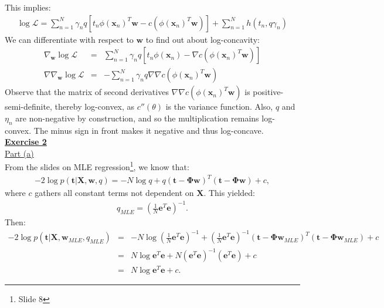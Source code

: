 \documentclass[a4paper, 11pt]{article}
\begin{document}
This implies:
\begin{eqnarray}
\log \mathcal{L} = \sum_{n=1}^{N} \gamma_n q [ t_n \phi(\mathbf{x}_n)^T \mathbf{w} - c(\phi(\mathbf{x}_n)^T \mathbf{w}) ] + \sum_{n=1}^{N} h(t_n, q \gamma_n) \nonumber
\end{eqnarray}
We can differentiate with respect to $\mathbf{w}$ to find out about log-concavity:
\begin{eqnarray}
\nabla_{\mathbf{w}} \log \mathcal{L} &=&  \sum_{n=1}^{N} \gamma_n q [ t_n \phi(\mathbf{x}_n) - \nabla c(\phi(\mathbf{x}_n)^T \mathbf{w}) ] \nonumber \\
\nabla \nabla_{\mathbf{w}} \log \mathcal{L} &=& - \sum_{n=1}^{N} \gamma_n q \nabla \nabla c(\phi(\mathbf{x}_n)^T \mathbf{w}) \nonumber
\end{eqnarray}
Observe that the matrix of second derivatives $\nabla \nabla c(\phi(\mathbf{x}_n)^T \mathbf{w})$ is positive-semi-definite, thereby log-convex, as $c''(\theta)$ is the variance function. Also, $q$ and $\eta_n$ are non-negative by construction, and so the multiplication remains log-convex. The minus sign in front makes it negative and  thus log-concave.\\
\newpage
\textbf{\underline{Exercise 2}}\\
\newline \underline{Part (a)}\\
\newline From the slides on MLE regression\footnote{Slide 8}, we know that:
\begin{eqnarray}
-2 \log p(\mathbf{t} | \mathbf{X}, \mathbf{w}, q) = -N \log q + q (\mathbf{t} - \mathbf{\Phi w})^T (\mathbf{t} - \mathbf{\Phi w}) + c, \nonumber
\end{eqnarray}
where $c$ gathers all constant terms not dependent on $\mathbf{X}$. This yielded:
\begin{eqnarray}
q_{MLE} = \left( \frac{1}{N} \mathbf{e}^T \mathbf{e} \right)^{-1}. \nonumber
\end{eqnarray}
Then:
\begin{eqnarray}
-2 \log p(\mathbf{t} | \mathbf{X}, \mathbf{w}_{MLE}, q_{MLE}) &=& -N \log \left( \frac{1}{N} \mathbf{e}^T \mathbf{e} \right)^{-1} + \left( \frac{1}{N} \mathbf{e}^T \mathbf{e} \right)^{-1} (\mathbf{t} - \mathbf{\Phi} \mathbf{w}_{MLE})^T (\mathbf{t} - \mathbf{\Phi} \mathbf{w}_{MLE}) + c \nonumber \\
&=& N \log \mathbf{e}^T \mathbf{e} + N \left( \mathbf{e}^T \mathbf{e} \right)^{-1} \left( \mathbf{e}^T \mathbf{e} \right) + c \nonumber \\
&=& N \log \mathbf{e}^T \mathbf{e} + c. \nonumber
\end{eqnarray}
\end{document}
